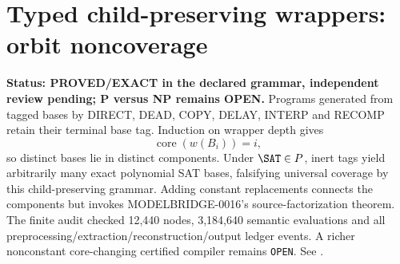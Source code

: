 \section{Typed child-preserving wrappers: orbit noncoverage}
\textbf{Status: PROVED/EXACT in the declared grammar, independent review pending; P versus NP remains OPEN.}
Programs generated from tagged bases by DIRECT, DEAD, COPY, DELAY, INTERP
and RECOMP retain their terminal base tag.  Induction on wrapper depth gives
\[
 \operatorname{core}(w(B_i))=i,
\]
so distinct bases lie in distinct components.  Under \(\SAT\in P\), inert
tags yield arbitrarily many exact polynomial SAT bases, falsifying universal
coverage by this child-preserving grammar.  Adding constant replacements
connects the components but invokes MODELBRIDGE-0016's source-factorization
theorem.  The finite audit checked 12,440 nodes, 3,184,640 semantic
evaluations and all preprocessing/extraction/reconstruction/output ledger
events.  A richer nonconstant core-changing certified compiler remains
\texttt{OPEN}.  See
.
